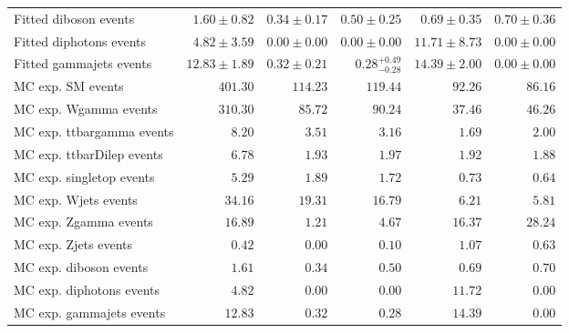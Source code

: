 \begin{table}
\begin{center}
{\begin{tabular*}{\textwidth}{@{\extracolsep{\fill}}lrrrrr}
        Fitted diboson events         & $1.60 \pm 0.82$          & $0.34 \pm 0.17$          & $0.50 \pm 0.25$          & $0.69 \pm 0.35$          & $0.70 \pm 0.36$              \\
        Fitted diphotons events         & $4.82 \pm 3.59$          & $0.00 \pm 0.00$          & $0.00 \pm 0.00$          & $11.71 \pm 8.73$          & $0.00 \pm 0.00$              \\
        Fitted gammajets events         & $12.83 \pm 1.89$          & $0.32 \pm 0.21$          & $0.28_{-0.28}^{+0.49}$          & $14.39 \pm 2.00$          & $0.00 \pm 0.00$              \\
 \noalign{\smallskip}\hline\noalign{\smallskip}
MC exp. SM events              & $401.30$          & $114.23$          & $119.44$          & $92.26$          & $86.16$              \\
\noalign{\smallskip}\hline\noalign{\smallskip}
        MC exp. Wgamma events         & $310.30$          & $85.72$          & $90.24$          & $37.46$          & $46.26$              \\
        MC exp. ttbargamma events         & $8.20$          & $3.51$          & $3.16$          & $1.69$          & $2.00$              \\
        MC exp. ttbarDilep events         & $6.78$          & $1.93$          & $1.97$          & $1.92$          & $1.88$              \\
        MC exp. singletop events         & $5.29$          & $1.89$          & $1.72$          & $0.73$          & $0.64$              \\
        MC exp. Wjets events         & $34.16$          & $19.31$          & $16.79$          & $6.21$          & $5.81$              \\
        MC exp. Zgamma events         & $16.89$          & $1.21$          & $4.67$          & $16.37$          & $28.24$              \\
        MC exp. Zjets events         & $0.42$          & $0.00$          & $0.10$          & $1.07$          & $0.63$              \\
        MC exp. diboson events         & $1.61$          & $0.34$          & $0.50$          & $0.69$          & $0.70$              \\
        MC exp. diphotons events         & $4.82$          & $0.00$          & $0.00$          & $11.72$          & $0.00$              \\
        MC exp. gammajets events         & $12.83$          & $0.32$          & $0.28$          & $14.39$          & $0.00$              \\

\end{tabular*}}
\end{center}
\end{table}
